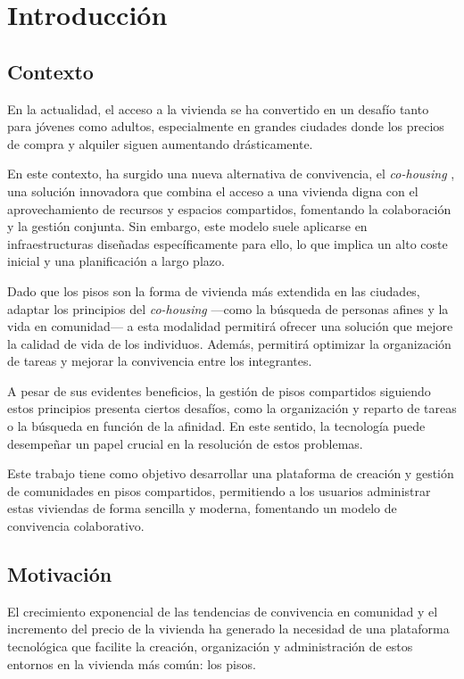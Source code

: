 \chapter{Introducción} \label{introduccion}

\section{Contexto}
En la actualidad, el acceso a la vivienda se ha convertido en un desafío tanto para jóvenes 
como adultos, especialmente en grandes ciudades donde los precios de compra y alquiler siguen 
aumentando drásticamente. 

En este contexto, ha surgido una nueva alternativa de convivencia, el 
\emph{co-housing} \cite{cohousing}, una solución innovadora que combina el acceso a una vivienda digna con el 
aprovechamiento de recursos y espacios compartidos, fomentando la colaboración y la gestión 
conjunta. Sin embargo, este modelo suele aplicarse en infraestructuras diseñadas específicamente 
para ello, lo que implica un alto coste inicial y una planificación a largo plazo.

Dado que los pisos son la forma de vivienda más extendida en las ciudades, adaptar los principios 
del \emph{co-housing} —como la búsqueda de personas afines y la vida en comunidad— a esta modalidad permitirá ofrecer una solución que mejore la calidad de vida de los individuos. Además, 
permitirá optimizar la organización de tareas y mejorar la convivencia entre los integrantes.

A pesar de sus evidentes beneficios, la gestión de pisos compartidos siguiendo estos principios presenta ciertos 
desafíos, como la organización y reparto de tareas o la búsqueda en función de la afinidad. En este sentido, la 
tecnología puede desempeñar un papel crucial en la resolución 
de estos problemas.

Este trabajo tiene como objetivo desarrollar una plataforma de creación y gestión de comunidades 
en pisos compartidos, permitiendo a los usuarios administrar estas viviendas de forma sencilla y 
moderna, fomentando un modelo de convivencia colaborativo.

\section{Motivación}
El crecimiento exponencial de las tendencias de convivencia en comunidad y el incremento del precio de la vivienda ha generado la necesidad de una plataforma tecnológica que facilite la creación, organización y administración de estos entornos en la vivienda más común: los pisos.

